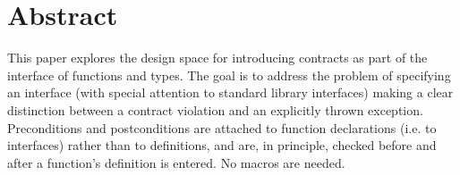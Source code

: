 \section*{Abstract}

This paper explores the design space for introducing contracts as part of the
interface of functions and types. The goal is to address the problem of
specifying an interface (with special attention to standard library interfaces)
making a clear distinction between a contract violation and an explicitly thrown
exception. Preconditions and postconditions are attached to function
declarations (i.e. to interfaces) rather than to definitions, and are, in
principle, checked before and after a function's definition is entered. No
macros are needed.
